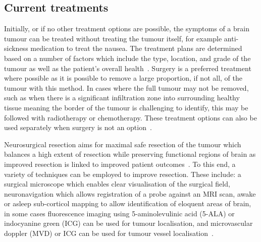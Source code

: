\subsection{Current treatments}\label{sec:introtumourtreatments}
Initially, or if no other treatment options are possible, the symptoms of a brain tumour can be treated without treating the tumour itself, for example anti-sickness medication to treat the nausea. The treatment plans are determined based on a number of factors which include the type, location, and grade of the tumour as well as the patient's overall health~\citep{NationalHealthService2023}. Surgery is a preferred treatment where possible as it is possible to remove a large proportion, if not all, of the tumour with this method. In cases where the full tumour may not be removed, such as when there is a significant infiltration zone into surrounding healthy tissue meaning the border of the tumour is challenging to identify, this may be followed with radiotherapy or chemotherapy. These treatment options can also be used separately when surgery is not an option~\citep{MacmillanCancerSupport2019}. 

Neurosurgical resection aims for maximal safe resection of the tumour which balances a high extent of resection while preserving functional regions of brain as improved resection is linked to improved patient outcomes~\citep{Chanbour2022}. To this end, a variety of techniques can be employed to improve resection. These include: a surgical microscope which enables clear visualisation of the surgical field, neuronavigation which allows registration of a probe against an MRI scan, awake or asleep sub-corticol mapping to allow identification of eloquent areas of brain, in some cases fluorescence imaging using 5-aminolevulinic acid (5-ALA) or indocyanine green (ICG) can be used for tumour localisation, and microvascular doppler (MVD) or ICG can be used for tumour vessel localisation~\citep{Chanbour2022, Catapano2018}.

